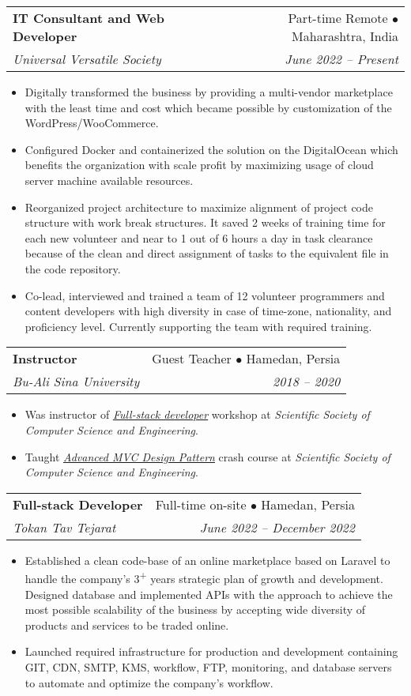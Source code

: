 \documentclass[letterpaper,11pt]{article}
\makeatletter
\newcommand{\resumeItem}[1]{
  \item\small{
    {#1 \vspace{-2pt}}
  }
}
\newcommand{\resumeSubheading}[4]{
  \vspace{-2pt}\item
    \begin{tabular*}{0.97\textwidth}[t]{l@{\extracolsep{\fill}}r}
      \textbf{#1} & #2 \\
      \textit{\small#3} & \textit{\small #4} \\
    \end{tabular*}\vspace{-7pt}
}
\newcommand{\resumeItemListStart}{\begin{itemize}}
\newcommand{\resumeItemListEnd}{\end{itemize}\vspace{-5pt}}
\makeatother
\begin{document}
    \resumeSubheading
      {IT Consultant and Web Developer}{Part-time Remote  $\bullet$ Maharashtra, India}
      {Universal Versatile Society}{June 2022 -- Present}

      \resumeItemListStart
        \resumeItem{Digitally transformed the business by providing a multi-vendor marketplace with the least time and cost which became possible by customization of the WordPress/WooCommerce.}
        \resumeItem{Configured Docker and containerized the solution on the DigitalOcean which benefits the organization with scale profit by maximizing usage of cloud server machine available resources.}
        \resumeItem{Reorganized project architecture to maximize alignment of project code structure with work break structures. It saved 2 weeks of training time for each new volunteer and near to 1 out of 6 hours a day in task clearance because of the clean and direct assignment of tasks to the equivalent file in the code repository. }
        \resumeItem{Co-lead, interviewed and trained a team of 12 volunteer programmers and content developers with high diversity in case of time-zone, nationality, and proficiency level. Currently supporting the team with required training.}
      \resumeItemListEnd

    \resumeSubheading
      {Instructor}{Guest Teacher $\bullet$ Hamedan, Persia}
      {Bu-Ali Sina University}{2018 -- 2020}

      \resumeItemListStart
        \resumeItem{Was instructor of \href{https://github.com/tayyebi/BASU-Full-Stack-98}{\emph{Full-stack developer}} workshop at \emph{Scientific Society of Computer Science and Engineering}. }
        \resumeItem{Taught \href{https://github.com/tayyebi/BASU-MVC-99}{\emph{Advanced MVC Design Pattern}} crash course at \emph{Scientific Society of Computer Science and Engineering}. }
            
      \resumeItemListEnd

    \resumeSubheading
      {Full-stack Developer}{Full-time on-site $\bullet$ Hamedan, Persia}
      {Tokan Tav Tejarat}{June 2022 -- December 2022}

      \resumeItemListStart
        \resumeItem{Established a clean code-base of an online marketplace based on Laravel to handle the company's 3\textsuperscript{+} years strategic plan of growth and development. Designed database and implemented APIs with the approach to achieve the most possible scalability of the business by accepting wide diversity of products and services to be traded online.}
        \resumeItem{Launched required infrastructure for production and development containing GIT, CDN, SMTP, KMS, workflow, FTP, monitoring, and database servers to automate and optimize the company's workflow.}
      \resumeItemListEnd
\end{document}
